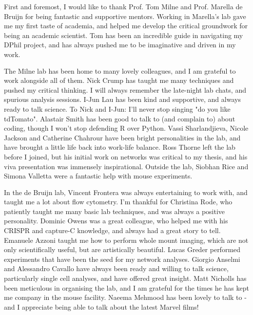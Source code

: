 

First and foremost, I would like to thank Prof. Tom Milne and Prof. Marella de Bruijn for being fantastic and supportive mentors. Working in Marella's lab gave me my first taste of academia, and helped me develop the critical groundwork for being an academic scientist. Tom has been an incredible guide in navigating my DPhil project, and has always pushed me to be imaginative and driven in my work. 
\vspace{-8pt}

The Milne lab has been home to many lovely colleagues, and I am grateful to work alongside all of them. Nick Crump has taught me many techniques and pushed my critical thinking. I will always remember the late-night lab chats, and spurious analysis sessions. I-Jun Lau has been kind and supportive, and always ready to talk science. To Nick and I-Jun: I'll never stop singing "do you like tdTomato". Alastair Smith has been good to talk to (and complain to) about coding, though I won't stop defending R over Python. Vassi Sharlandjieva, Nicole Jackson and Catherine Chahrour have been bright personalities in the lab, and have brought a little life back into work-life balance. Ross Thorne left the lab before I joined, but his initial work on networks was critical to my thesis, and his viva presentation was immensely inspirational. Outside the lab, Siobhan Rice and Simona Valletta were a fantastic help with mouse experiments.
\vspace{-8pt}

In the de Bruijn lab, Vincent Frontera was always entertaining to work with, and taught me a lot about flow cytometry. I'm thankful for Christina Rode, who patiently taught me many basic lab techniques, and was always a positive personality. Dominic Owens was a great colleague, who helped me with his CRISPR and capture-C knowledge, and always had a great story to tell. Emanuele Azzoni taught me how to perform whole mount imaging, which are not only scientifically useful, but are artistically beautiful. Lucas Greder performed experiments that have been the seed for my network analyses. Giorgio Anselmi and Alessandro Cavallo have always been ready and willing to talk science, particularly single cell analyses, and have offered great insight. Matt Nicholls has been meticulous in organising the lab, and I am grateful for the times he has kept me company in the mouse facility. Naeema Mehmood has been lovely to talk to - and I appreciate being able to talk about the latest Marvel films!
\vspace{-8pt}

